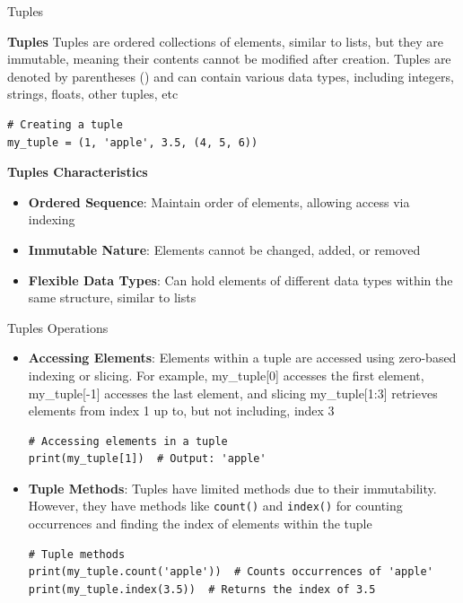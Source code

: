 \documentclass[
	11pt, 
]{beamer}
\begin{document}
\begin{frame}[fragile]{Tuples}
\scriptsize
    
\begin{block}{\textbf{Tuples}}
 Tuples are ordered collections of elements, similar to lists, but they are immutable, meaning their contents cannot be modified after creation. Tuples are denoted by parentheses () and can contain various data types, including integers, strings, floats, other tuples, etc
\end{block}
\begin{verbatim}
# Creating a tuple
my_tuple = (1, 'apple', 3.5, (4, 5, 6))
\end{verbatim}

\begin{exampleblock}{\textbf{Tuples Characteristics}}
    \begin{itemize}
        \item \textbf{Ordered Sequence}: Maintain order of elements, allowing access via indexing
        \item \textbf{Immutable Nature}: Elements cannot be changed, added, or removed
        \item \textbf{Flexible Data Types}: Can hold elements of different data types within the same structure, similar to lists
    \end{itemize}    
\end{exampleblock}

\end{frame}


\begin{frame}[fragile]{Tuples Operations}
\scriptsize
\begin{itemize}
    \item \textbf{Accessing Elements}: Elements within a tuple are accessed using zero-based indexing or slicing. For example, my\_tuple[0] accesses the first element, my\_tuple[-1] accesses the last element, and slicing my\_tuple[1:3] retrieves elements from index 1 up to, but not including, index 3

    \vspace{.5cm}

    \begin{verbatim}
# Accessing elements in a tuple
print(my_tuple[1])  # Output: 'apple'
    \end{verbatim}

    \item \textbf{Tuple Methods}: Tuples have limited methods due to their immutability. However, they have methods like \texttt{count()} and \texttt{index()} for counting occurrences and finding the index of elements within the tuple

    \begin{verbatim}
# Tuple methods
print(my_tuple.count('apple'))  # Counts occurrences of 'apple' 
print(my_tuple.index(3.5))  # Returns the index of 3.5 
    \end{verbatim}
    
\end{itemize}
\end{frame}
\end{document}
